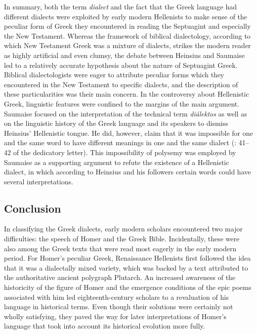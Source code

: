 In summary, both the term \textit{dialect} and the fact that the Greek language had different dialects were exploited by early modern Hellenists to make sense of the peculiar form of Greek they encountered in reading the Septuagint and especially the New Testament. Whereas the framework of biblical dialectology, according to which New Testament Greek was a mixture of dialects, strikes the modern reader as highly artificial and even clumsy, the debate between Heinsius and Saumaise led to a relatively accurate hypothesis about the nature of Septuagint Greek. Biblical dialectologists were eager to attribute peculiar forms which they encountered in the New Testament to specific dialects, and the description of these particularities was their main concern. In the controversy about Hellenistic Greek, linguistic features were confined to the margins of the main argument. Saumaise focused on the interpretation of the technical term \textit{diálektos} as well as on the linguistic history of the Greek language and its speakers to dismiss Heinsius’ Hellenistic tongue. He did, however, claim that it was impossible for one and the same word to have different meanings in one and the same dialect (\citealt{Saumaise1643a}: 41–42 of the dedicatory letter). This impossibility of polysemy was employed by Saumaise as a supporting argument to refute the existence of a Hellenistic dialect, in which according to Heinsius and his followers certain words could have several interpretations.

\subsection{Conclusion}
\hypertarget{Toc19704833}{}
In classifying the Greek dialects, early modern scholars encountered two major difficulties: the speech of Homer and the Greek Bible. Incidentally, these were also among the Greek texts that were read most eagerly in the early modern period. For Homer’s peculiar Greek, Renaissance Hellenists first followed the idea that it was a dialectally mixed variety, which was backed by a text attributed to the authoritative ancient polygraph Plutarch. An increased awareness of the historicity of the figure of Homer and the emergence conditions of the epic poems associated with him led eighteenth-century scholars to a revaluation of his language in historical terms. Even though their solutions were certainly not wholly satisfying, they paved the way for later interpretations of Homer’s language that took into account its historical evolution more fully.


